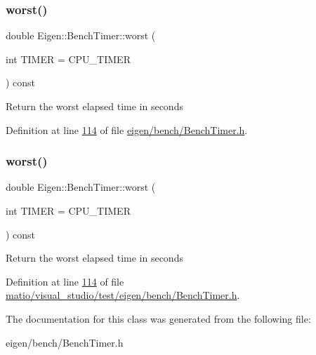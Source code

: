 \subsubsection{\texorpdfstring{worst()}{worst()}\hspace{0.1cm}{\footnotesize\ttfamily [1/2]}}
{\footnotesize\ttfamily double Eigen\+::\+Bench\+Timer\+::worst (\begin{DoxyParamCaption}\item[{int}]{T\+I\+M\+ER = {\ttfamily CPU\+\_\+TIMER} }\end{DoxyParamCaption}) const\hspace{0.3cm}{\ttfamily [inline]}}

Return the worst elapsed time in seconds 

Definition at line \hyperlink{eigen_2bench_2_bench_timer_8h_source_l00114}{114} of file \hyperlink{eigen_2bench_2_bench_timer_8h_source}{eigen/bench/\+Bench\+Timer.\+h}.

\mbox{\label{class_eigen_1_1_bench_timer_ab912bf8bcae22898c85d907f0810173e}} 
\subsubsection{\texorpdfstring{worst()}{worst()}\hspace{0.1cm}{\footnotesize\ttfamily [2/2]}}
{\footnotesize\ttfamily double Eigen\+::\+Bench\+Timer\+::worst (\begin{DoxyParamCaption}\item[{int}]{T\+I\+M\+ER = {\ttfamily CPU\+\_\+TIMER} }\end{DoxyParamCaption}) const\hspace{0.3cm}{\ttfamily [inline]}}

Return the worst elapsed time in seconds 

Definition at line \hyperlink{matio_2visual__studio_2test_2eigen_2bench_2_bench_timer_8h_source_l00114}{114} of file \hyperlink{matio_2visual__studio_2test_2eigen_2bench_2_bench_timer_8h_source}{matio/visual\+\_\+studio/test/eigen/bench/\+Bench\+Timer.\+h}.



The documentation for this class was generated from the following file\+:\begin{DoxyCompactItemize}
\item 
eigen/bench/\+Bench\+Timer.\+h\end{DoxyCompactItemize}

